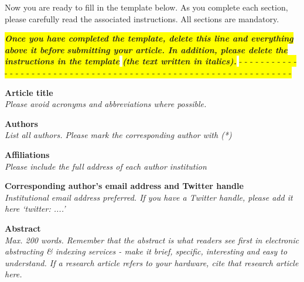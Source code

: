 \documentclass[11pt, letterpaper]{article}
\begin{document}
\begin{flushleft}
Now you are ready to fill in the template below. As you complete each section, please carefully read the associated instructions. All sections are mandatory.
\begin{center}
\colorbox{yellow}{\textbf{ \textit{ Once you have completed the template, delete this line and everything above it before} }}
\colorbox{yellow}{\textbf{ \textit{ submitting your article. In addition, please delete the instructions in the template}}}
\colorbox{yellow}{\textbf{ \textit{  (the text written in italics).}}}
\colorbox{yellow}{- - - - - - - - - - - - - - - - - - - - - - - - - - - - - - - - - - - - - - - - - - - - - - - - - - - - - - - - - - - - - - - - }
\end{center}



\setlength{\parindent}{0pt}
\setlength{\parskip}{10pt}

\textbf{Article title}\\ \textit{Please avoid acronyms and abbreviations where possible.}

\textbf{Authors}\\ \textit{List all authors. Please mark the corresponding author with (*)}

\textbf{Affiliations}\\ \textit{Please include the full address of each author institution}

\textbf{Corresponding author’s email address and Twitter handle}\\ \textit{Institutional email address preferred. If you have a Twitter handle, please add it here ‘twitter: \@....’}

\textbf{Abstract}\\ \textit{Max. 200 words. Remember that the abstract is what readers see first in electronic abstracting \& indexing services - make it brief, specific, interesting and easy to understand. If a research article refers to your hardware, cite that research article here.}


\end{flushleft}
\end{document}
